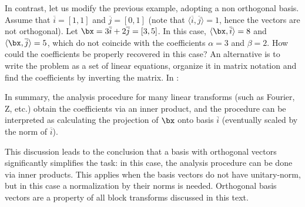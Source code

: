 In contrast, let us modify the previous example, adopting a non orthogonal basis. Assume that  $\overline i=[1, 1]$ and $\overline j=[0, 1]$ (note that $\langle\overline i , \overline j\rangle=1$, hence the vectors are not orthogonal). Let $\bx=3\overline i+2\overline j=[3,5]$. In this case, $\langle\bx, \overline i\rangle=8$ and $\langle\bx, \overline j\rangle=5$, which do not coincide with the coefficients $\alpha=3$ and $\beta=2$. How could the coefficients be properly recovered in this case? An alternative is to write the problem as a set of linear equations, organize it in matrix notation and find the coefficients by inverting the matrix. In {\matlab}:

In summary, the analysis procedure for many  linear transforms (such as Fourier, Z, etc.) obtain the coefficients via an inner product, and the procedure can be interpreted as calculating the projection of $\bx$ onto basis $\overline i$ (eventually scaled by the norm of $\overline i$).
\eExample


This discussion leads to the conclusion that a basis with orthogonal vectors significantly simplifies the task: in this case, the analysis procedure can be done via inner products. This applies when the basis vectors do not have unitary-norm, but in this case a normalization by their norms is needed. Orthogonal basis vectors are a property of all block transforms discussed in this text.


